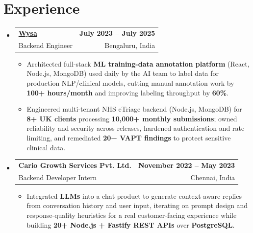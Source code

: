 \documentclass[letterpaper,10pt]{article}
\makeatletter
\newcommand{\resumeItem}[1]{
  \item\small{#1\vspace{-1pt}}
}
\newcommand{\resumeSubheading}[4]{
  \vspace{1pt}\item
    \begin{tabular*}{0.985\textwidth}[t]{l@{\extracolsep{\fill}}r}
      \textbf{#1} & \textbf{\small #2} \\
      {\small\color{ResumeSlate} #3} & {\small\color{ResumeSlate} #4} \\
    \end{tabular*}\vspace{-6pt}
}
\newcommand{\resumeSubHeadingListStart}{\begin{itemize}[leftmargin=0.0in, label={}, itemsep=2pt, topsep=2pt]}
\newcommand{\resumeSubHeadingListEnd}{\end{itemize}}
\newcommand{\resumeItemListStart}{\begin{itemize}[leftmargin=0.18in, itemsep=2pt, topsep=1pt]}
\newcommand{\resumeItemListEnd}{\end{itemize}\vspace{-4pt}}
\makeatother
\begin{document}
\section{Experience}
\resumeSubHeadingListStart
  \resumeSubheading
    {\href{https://www.wysa.io}{Wysa}}{July 2023 -- July 2025}
    {Backend Engineer}{Bengaluru, India}
    \resumeItemListStart
      \resumeItem{Architected full-stack \textbf{ML training-data annotation platform} (React, Node.js, MongoDB) used daily by the AI team to label data for production NLP/clinical models, cutting manual annotation work by \textbf{100+ hours/month} and improving labeling throughput by \textbf{60\%}.}
      \resumeItem{Engineered multi-tenant NHS eTriage backend (Node.js, MongoDB) for \textbf{8+ UK clients} processing \textbf{10{,}000+ monthly submissions}; owned reliability and security across releases, hardened authentication and rate limiting, and remediated \textbf{20+ VAPT findings} to protect sensitive clinical data.}
    \resumeItemListEnd
  \resumeSubheading
    {Cario Growth Services Pvt. Ltd.}{November 2022 -- May 2023}
    {Backend Developer Intern}{Chennai, India}
    \resumeItemListStart
      \resumeItem{Integrated \textbf{LLMs} into a chat product to generate context-aware replies from conversation history and user input, iterating on prompt design and response-quality heuristics for a real customer-facing experience while building \textbf{20+ Node.js + Fastify REST APIs} over \textbf{PostgreSQL}.}
    \resumeItemListEnd
\resumeSubHeadingListEnd
\vspace{-4pt}
\end{document}
